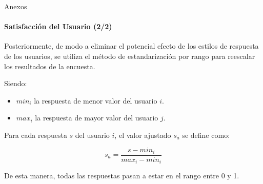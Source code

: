 \begin{frame}[noframenumbering]{Anexos}
\framesubtitle{Satisfacci\'on del Usuario (2/2)}
Posteriormente, de modo a eliminar el potencial efecto de los estilos de respuesta
de los usuarios, se utiliza el m\'etodo de estandarizaci\'on 
por rango para reescalar los resultados de la encuesta.

Siendo:
\begin{itemize}
	\item $min_i$ la respuesta de menor valor del usuario $i$.
	\item $max_i$ la respuesta de mayor valor del usuario $j$.
\end{itemize}

Para cada respuesta $s$ del usuario $i$, el valor ajustado $s_a$ se define como:

\begin{equation*}
s_a=\frac{s-min_i}{max_i-min_i}
\end{equation*}


De esta manera, todas las respuestas pasan a estar en el rango entre 0 y 1.  
\end{frame}